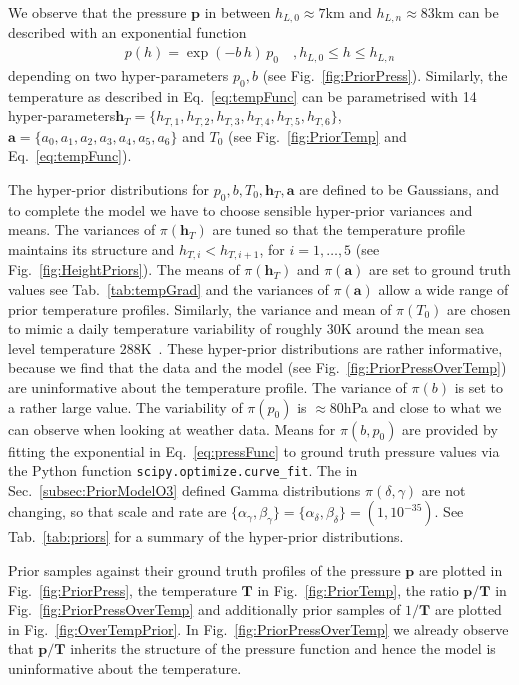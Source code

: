 We observe that the pressure $\bm{p}$ in between $h_{L,0} \approx 7$km and $h_{L,n} \approx 83$km can be described with an exponential function
\begin{align}
	p(h) =
	\exp \left( -b \, h \right)   \,  p_0 \quad , \text{$h_{L,0}  \leq h \leq h_{L,n}$}
	\label{eq:pressFunc}
\end{align}
depending on two hyper-parameters $p_0,b$ (see Fig.~\ref{fig:PriorPress}).
Similarly, the temperature as described in Eq.~\ref{eq:tempFunc} can be parametrised with 14 hyper-parameters\linebreak $\bm{h}_T = \{ h_{T,1}, h_{T,2},h_{T,3},h_{T,4},h_{T,5},h_{T,6} \}$, $\bm{a} = \{a_0, a_1, a_2,a_3,a_4,a_5,a_6 \} $ and $T_0$ (see Fig.~\ref{fig:PriorTemp} and Eq.~\ref{eq:tempFunc}).

The hyper-prior distributions for $p_0,b, T_0,\bm{h}_T ,\bm{a} $ are defined to be Gaussians, and to complete the model we have to choose sensible hyper-prior variances and means.
The variances of $\pi(\bm{h}_T)$ are tuned so that the temperature profile maintains its structure and $ h_{T, i} < h_{T, i+1}$, for $i = 1,\dots, 5$ (see Fig.~\ref{fig:HeightPriors}).
The means of $\pi(\bm{h}_T)$ and $\pi(\bm{a})$ are set to ground truth values see Tab.~\ref{tab:tempGrad} and the variances of $\pi(\bm{a})$ allow a wide range of prior temperature profiles.
Similarly, the variance and mean of $\pi(T_0)$ are chosen to mimic a daily temperature variability of roughly $30$K around the mean sea level temperature $288$K~\cite{atmosphere1976us}.
These hyper-prior distributions are rather informative, because we find that the data and the model (see Fig.~\ref{fig:PriorPressOverTemp}) are uninformative about the temperature profile.
The variance of $\pi(b)$ is set to a rather large value.
The variability of $\pi(p_0)$ is $\approx 80$hPa and close to what we can observe when looking at weather data.
Means for $\pi(b ,p_0)$ are provided by fitting the exponential in Eq.~\ref{eq:pressFunc} to ground truth pressure values via the Python function \texttt{scipy.optimize.curve\_fit}.
The in Sec.~\ref{subsec:PriorModelO3} defined Gamma distributions $\pi(\delta,\gamma)$ are not changing, so that scale and rate are $\{  \alpha_\gamma, \beta_\gamma\}  = \{ \alpha_\delta ,\beta_\delta\} = (1,10^{-35})$.
See Tab.~\ref{tab:priors} for a summary of the hyper-prior distributions.

Prior samples against their ground truth profiles of the pressure $\bm{p}$ are plotted in Fig.~\ref{fig:PriorPress}, the temperature $\bm{T}$ in Fig.~\ref{fig:PriorTemp}, the ratio $\bm{p}/\bm{T}$ in Fig.~\ref{fig:PriorPressOverTemp} and additionally prior samples of $1/\bm{T}$ are plotted in Fig.~\ref{fig:OverTempPrior}.
In Fig.~\ref{fig:PriorPressOverTemp} we already observe that $\bm{p}/\bm{T}$ inherits the structure of the pressure function and hence the model is uninformative about the temperature.
\clearpage
